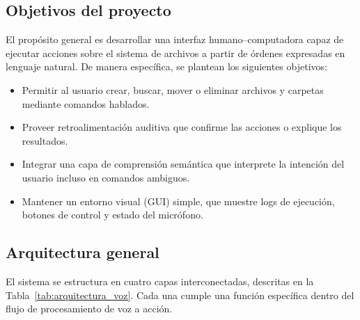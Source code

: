 \documentclass[12pt,a4paper]{report}
\numberwithin{figure}{section}
\begin{document}
\vspace{1em}
\subsection{Objetivos del proyecto}
\label{subsec:objetivos_voz}

El propósito general es desarrollar una interfaz humano–computadora capaz de ejecutar acciones sobre el sistema de archivos a partir de órdenes expresadas en lenguaje natural.  
De manera específica, se plantean los siguientes objetivos:

\begin{itemize}
    \item Permitir al usuario crear, buscar, mover o eliminar archivos y carpetas mediante comandos hablados.
    \item Proveer retroalimentación auditiva que confirme las acciones o explique los resultados.
    \item Integrar una capa de comprensión semántica que interprete la intención del usuario incluso en comandos ambiguos.
    \item Mantener un entorno visual (GUI) simple, que muestre logs de ejecución, botones de control y estado del micrófono.
\end{itemize}

\vspace{1em}
\subsection{Arquitectura general}
\label{subsec:arquitectura_voz}

El sistema se estructura en cuatro capas interconectadas, descritas en la Tabla~\ref{tab:arquitectura_voz}.  
Cada una cumple una función específica dentro del flujo de procesamiento de voz a acción.
\end{document}
